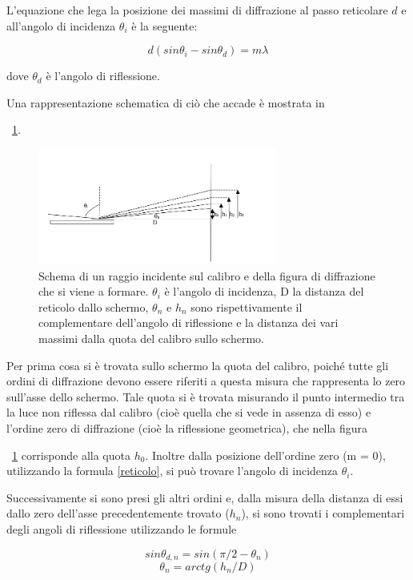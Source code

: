 \documentclass[a4paper,10pt]{article}
\begin{document}
L'equazione che lega la posizione dei massimi di diffrazione al passo reticolare $d$ e all'angolo di incidenza $\theta_i$ è la seguente:

\begin{equation}
d(sin\theta_i - sin\theta_d)= m\lambda
\label{reticolo}
\end{equation}

dove $\theta_d$ è l'angolo di riflessione.

Una rappresentazione schematica di ciò che accade è mostrata in \figurename{~\ref{fig:espa}.

\begin{figure}[H]
	\centering
	\includegraphics[width=0.7\textwidth]{../grafici/espa.png}
	\caption{Schema di un raggio incidente sul calibro e della figura di diffrazione che si viene a formare. $\theta_i$ è l'angolo di incidenza, D la distanza del reticolo dallo schermo, $\theta_n$ e $h_n$ sono rispettivamente il complementare dell'angolo di riflessione e la distanza dei vari massimi dalla quota del calibro sullo schermo.}
	\label{fig:espa}
\end{figure}

Per prima cosa si è trovata sullo schermo la quota del calibro, poiché tutte gli ordini di diffrazione devono essere riferiti a questa misura che rappresenta lo zero sull'asse dello schermo. Tale quota si è trovata misurando il punto intermedio tra la luce non riflessa dal calibro (cioè quella che si vede in assenza di esso) e l'ordine zero di diffrazione (cioè la riflessione geometrica), che nella figura \figurename{~\ref{fig:espa} corrisponde alla quota $h_0$. Inoltre dalla posizione dell'ordine zero (m = 0), utilizzando la formula \eqref{reticolo}, si può trovare l'angolo di incidenza $\theta_i$.
	
Successivamente si sono presi gli altri ordini e, dalla misura della distanza di essi dallo zero dell'asse precedentemente trovato ($h_n$), si sono trovati i complementari degli angoli di riflessione utilizzando le formule

\begin{equation}
sin\theta_{d,n} = sin(\pi/2 - \theta_n)
\label{thetad}
\end{equation}
\begin{equation}
\theta_n = arctg(h_n/D)
\label{thetan}
\end{equation}

}}
\end{document}
